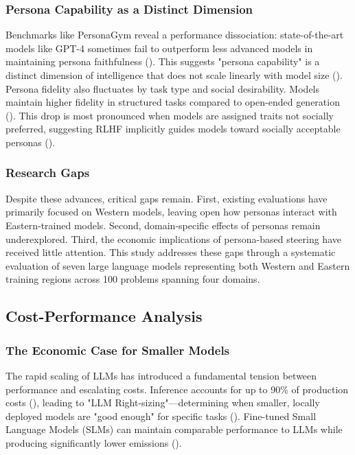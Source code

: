 \documentclass{article}
\begin{document}
\subsubsection{Persona Capability as a Distinct Dimension}

Benchmarks like PersonaGym reveal a performance dissociation: state-of-the-art models like GPT-4 sometimes fail to outperform less advanced models in maintaining persona faithfulness (\cite{vinay_samuel_301ec4c0}). This suggests "persona capability" is a distinct dimension of intelligence that does not scale linearly with model size (\cite{vinay_samuel_301ec4c0}). Persona fidelity also fluctuates by task type and social desirability. Models maintain higher fidelity in structured tasks compared to open-ended generation (\cite{jisu_shin_0a44d92a}). This drop is most pronounced when models are assigned traits not socially preferred, suggesting RLHF implicitly guides models toward socially acceptable personas (\cite{manon_reusens_1659b7a7}).

\subsubsection{Research Gaps}

Despite these advances, critical gaps remain. First, existing evaluations have primarily focused on Western models, leaving open how personas interact with Eastern-trained models. Second, domain-specific effects of personas remain underexplored. Third, the economic implications of persona-based steering have received little attention. This study addresses these gaps through a systematic evaluation of seven large language models representing both Western and Eastern training regions across 100 problems spanning four domains.

\subsection{Cost-Performance Analysis}

\subsubsection{The Economic Case for Smaller Models}

The rapid scaling of LLMs has introduced a fundamental tension between performance and escalating costs. Inference accounts for up to 90\% of production costs (\cite{francisco_dur_n_a28bb68b}), leading to "LLM Right-sizing"—determining when smaller, locally deployed models are "good enough" for specific tasks (\cite{jennifer_haase_36a334aa}). Fine-tuned Small Language Models (SLMs) can maintain comparable performance to LLMs while producing significantly lower emissions (\cite{anandita_garg_c5aff6a3,anuj_kumar_1c38e9e4}).
\end{document}
